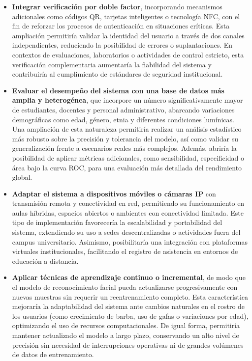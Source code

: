 {\renewcommand{\labelitemi}{\textbullet}
\begin{itemize}
    \item \textbf{Integrar verificación por doble factor}, incorporando mecanismos adicionales como códigos QR, tarjetas inteligentes o tecnología NFC, con el fin de reforzar los procesos de autenticación en situaciones críticas. Esta ampliación permitiría validar la identidad del usuario a través de dos canales independientes, reduciendo la posibilidad de errores o suplantaciones. En contextos de evaluaciones, laboratorios o actividades de control estricto, esta verificación complementaria aumentaría la fiabilidad del sistema y contribuiría al cumplimiento de estándares de seguridad institucional.

    \item \textbf{Evaluar el desempeño del sistema con una base de datos más amplia y heterogénea}, que incorpore un número significativamente mayor de estudiantes, docentes y personal administrativo, abarcando variaciones demográficas como edad, género, etnia y diferentes condiciones lumínicas. Una ampliación de esta naturaleza permitiría realizar un análisis estadístico más robusto sobre la precisión y tolerancia del modelo, así como validar su generalización frente a escenarios reales más complejos. Además, abriría la posibilidad de aplicar métricas adicionales, como sensibilidad, especificidad o área bajo la curva ROC, para una evaluación más detallada del rendimiento global.

    \item \textbf{Adaptar el sistema a dispositivos móviles o cámaras IP} con transmisión remota y conectividad en red, permitiendo su funcionamiento en aulas híbridas, espacios abiertos o ambientes con conectividad limitada. Este tipo de implementación favorecería la escalabilidad y portabilidad del sistema, extendiendo su uso a sedes descentralizadas o actividades fuera del campus universitario. Asimismo, posibilitaría una integración con plataformas virtuales institucionales, facilitando el registro de asistencia en entornos de educación a distancia.

    \item \textbf{Aplicar técnicas de aprendizaje continuo o incremental}, de modo que el modelo de reconocimiento facial pueda actualizarse progresivamente con nuevas muestras sin requerir un reentrenamiento completo. Esta característica mejoraría la adaptabilidad del sistema ante cambios naturales en el rostro de los usuarios (como crecimiento de barba, uso de gafas o variaciones por edad), optimizando el uso de recursos computacionales. De igual forma, permitiría mantener actualizado el modelo a largo plazo, conservando un alto nivel de precisión sin necesidad de interrupciones operativas ni de grandes volúmenes de datos de entrenamiento.


\end{itemize}}
